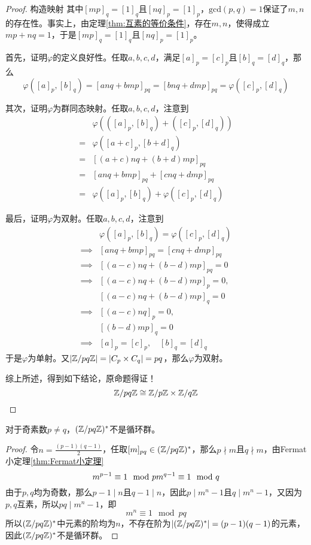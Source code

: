 \begin{proof}
	构造映射
	其中$[mp]_{q}=[1]_q$且$[nq]_{p}=[1]_p$，$\mathrm{gcd}(p,q)=1$保证了$m,n$的存在性。事实上，由定理\ref{thm:互素的等价条件}，存在$m,n$，使得成立$mp+nq=1$，于是$[mp]_{q}=[1]_q$且$[nq]_{p}=[1]_p$。
	
	首先，证明$\varphi$的定义良好性。任取$a,b,c,d$，满足$[a]_p=[c]_p$且$[b]_q=[d]_q$，那么
	$$
	\varphi([a]_p,[b]_q)=[anq+bmp]_{pq}=[bnq+dmp]_{pq}=\varphi([c]_p,[d]_q)
	$$
	
	其次，证明$\varphi$为群同态映射。任取$a,b,c,d$，注意到
	\begin{align*}
		& \varphi(([a]_p,[b]_q)+([c]_p,[d]_q))\\
		=& \varphi([a+c]_p,[b+d]_q)\\
		=& [(a+c)nq+(b+d)mp]_{pq}\\
		=& [anq+bmp]_{pq}+[cnq+dmp]_{pq}\\
		=& \varphi([a]_p,[b]_q)+\varphi([c]_p,[d]_q)
	\end{align*}
	
	最后，证明$\varphi$为双射。任取$a,b,c,d$，注意到
	\begin{align*}
		& \varphi([a]_p,[b]_q)=\varphi([c]_p,[d]_q)\\
		\implies & [anq+bmp]_{pq}=[cnq+dmp]_{pq}\\
		\implies & [(a-c)nq+(b-d)mp]_{pq}=0\\
		\implies & [(a-c)nq+(b-d)mp]_{p}=0,\\
		& [(a-c)nq+(b-d)mp]_{q}=0\\
		\implies & [(a-c)nq]_{p}=0,\\
		& [(b-d)mp]_{q}=0\\
		\implies & [a]_p=[c]_p,\quad [b]_q=[d]_q
	\end{align*}
	于是$\varphi$为单射。又$|\mathbb{Z}/pq\mathbb{Z}|=|C_{p}\times C_{q}|=pq$，那么$\varphi$为双射。
	
	综上所述，得到如下结论，原命题得证！
	$$
	\mathbb{Z}/pq\mathbb{Z}\cong \mathbb{Z}/p\mathbb{Z}\times \mathbb{Z}/q\mathbb{Z}
	$$
\end{proof}

\begin{proposition}
	对于奇素数$p\ne q$，$(\mathbb{Z}/pq\mathbb{Z})^*$不是循环群。
\end{proposition}

\begin{proof}
	令$n=\frac{(p-1)(q-1)}{2}$，任取$[m]_{pq}\in(\mathbb{Z}/pq\mathbb{Z})^*$，那么$p\nmid m$且$q\nmid m$，由Fermat小定理\ref{thm:Fermat小定理}
	$$
	m^{p-1}\equiv  1 \mod p\\
	m^{q-1}\equiv  1 \mod q
	$$
	由于$p,q$均为奇数，那么$p-1\mid n$且$q-1\mid n$，因此$p\mid m^n-1$且$q\mid m^n-1$，又因为$p,q$互素，所以$pq\mid m^n-1$，即
	$$
	m^n\equiv 1\mod pq
	$$
	所以$(\mathbb{Z}/pq\mathbb{Z})^*$中元素的阶均为$n$，不存在阶为$|(\mathbb{Z}/pq\mathbb{Z})^*|=(p-1)(q-1)$的元素，因此$(\mathbb{Z}/pq\mathbb{Z})^*$不是循环群。
\end{proof}

